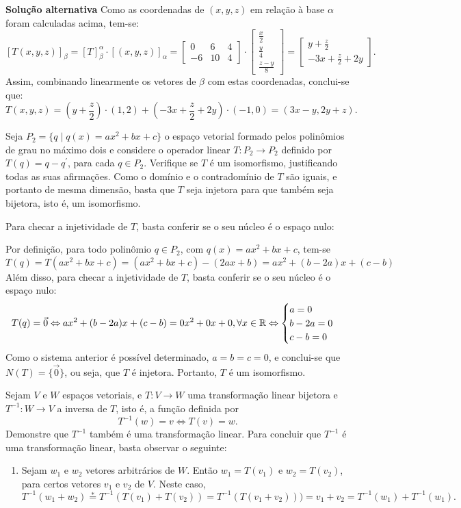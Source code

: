 \documentclass[12pt,a4paper]{article}
\newcommand*\R{\mathbb{R}}
\begin{document}
\begin{ExerciseList}
\textbf{Solução alternativa} Como as coordenadas de $(x,y,z)$ em relação à base $\alpha$ foram calculadas acima, tem-se:
\[
[T(x,y,z)]_\beta
= [T]_\beta^\alpha \cdot [(x,y,z)]_\alpha
= \begin{bmatrix}
 0 &  6 & 4\\
-6 & 10 & 4
\end{bmatrix}
\cdot
\begin{bmatrix}
\frac{x}{2} \\ \frac{y}{4} \\ \frac{z-y}{8}
\end{bmatrix}
=
\begin{bmatrix}
y+\frac{z}{2}\\
-3x+\frac{z}{2}+2y
\end{bmatrix}.
\]
Assim, combinando linearmente os vetores de $\beta$ com estas coordenadas, conclui-se que:
\[
T(x,y,z)
= \left(y+\frac{z}{2}\right)\cdot (1,2) + \left(-3x+\frac{z}{2}+2y\right)\cdot (-1,0)
= (3x-y,2y+z).
\]

\Exercise[title={2,0}] Seja $P_2 = \{ q \mid q(x) = ax^2+bx+c\}$ o espaço vetorial formado pelos polinômios de grau no máximo dois e considere o operador linear $T:P_2 \to P_2$ definido por $T(q) = q - q^\prime$, para cada $q \in P_2$. Verifique se $T$ é um isomorfismo, justificando todas as suas afirmações.
\Answer Como o domínio e o contradomínio de $T$ são iguais, e portanto de mesma dimensão, basta que $T$ seja injetora para que também seja bijetora, isto é, um isomorfismo.

Para checar a injetividade de $T$, basta conferir se o seu núcleo é o espaço nulo:

Por definição, para todo polinômio $q \in P_2$, com $q(x) = ax^2+bx+c$, tem-se
\[
T(q)
= T(ax^2+bx+c)
= (ax^2+bx+c)-(2ax+b)
= ax^2+(b-2a)x+(c-b)
\]
Além disso, para checar a injetividade de $T$, basta conferir se o seu núcleo é o espaço nulo:
\[
T(q) = \vec{0}
\Leftrightarrow ax^2+(b-2a)x+(c-b) = 0x^2+0x+0, \forall x \in \R\\
\Leftrightarrow
\begin{cases}
a = 0\\
b-2a = 0\\
c-b =0
\end{cases}
\]
Como o sistema anterior é possível determinado, $a=b=c=0$, e conclui-se que $N(T) = \{ \vec{0} \}$, ou seja, que $T$ é injetora. Portanto, $T$ é um isomorfismo.


\Exercise[title={2,0}] Sejam $V$ e $W$ espaços vetoriais, e $T: V \to W$ uma transformação linear bijetora e $T^{-1}: W \to V$ a inversa de $T$, isto é, a função definida por
\[
T^{-1}(w) = v \Leftrightarrow T(v) = w.
\]
Demonstre que $T^{-1}$ também é uma transformação linear.
\Answer Para concluir que $T^{-1}$ é uma transformação linear, basta observar o seguinte:
\begin{enumerate}
\item Sejam $w_1$ e $w_2$ vetores arbitrários de $W$. Então
$w_1 = T(v_1)$ e $w_2 = T(v_2)$, para certos vetores $v_1$ e $v_2$ de $V$. Neste caso,
\[
T^{-1}(w_1 + w_2)
\stackrel{*}{=} T^{-1}(T(v_1) + T(v_2))
= T^{-1}(T(v_1+v_2)))
= v_1 + v_2
= T^{-1}(w_1)+T^{-1}(w_1).
\]


\end{enumerate}
\end{ExerciseList}
\end{document}
